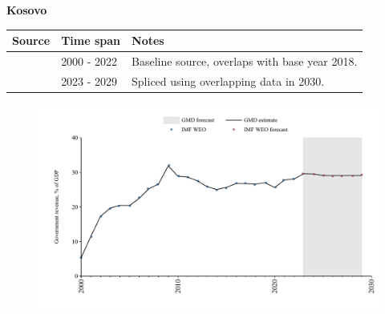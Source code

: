 \documentclass[12pt,a4paper,landscape]{article}
\begin{document}
\begin{adjustbox}{max totalsize={\paperwidth}{\paperheight},center}
\begin{minipage}[t][\textheight][t]{\textwidth}
\vspace*{0.5cm}
{}
\begin{center}
{\Large\bfseries Kosovo}
\end{center}
\vspace{0.5cm}
\begin{table}[H]
\centering
\small
\begin{tabular}{|l|l|l|}
\hline
\textbf{Source} & \textbf{Time span} & \textbf{Notes} \\
\hline
\rowcolor{white}\cite{IMF_WEO}& 2000 - 2022 &Baseline source, overlaps with base year 2018.\\
\rowcolor{lightgray}\cite{IMF_WEO_forecast}& 2023 - 2029 &Spliced using overlapping data in 2030.\\
\hline
\end{tabular}
\end{table}
\begin{figure}[H]
\centering
\includegraphics[width=\textwidth,height=0.6\textheight,keepaspectratio]{graphs/XKX_govrev_GDP.pdf}
\end{figure}
\end{minipage}
\end{adjustbox}
\end{document}
